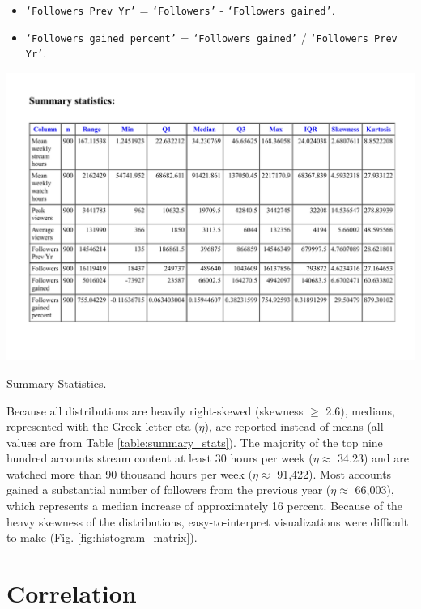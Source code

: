 \documentclass[12pt]{article}
\begin{document}
\begin{itemize}
	\item \texttt{`Followers Prev Yr’} = \texttt{`Followers’} - \texttt{`Followers gained’}.
	\item \texttt{`Followers gained percent’} = \texttt{`Followers gained’} / \texttt{`Followers Prev Yr’}.
\end{itemize}

\begin{table}[H]
  \centering
  \includegraphics[width=0.8\linewidth]{../StatCrunch_Results/table}
  \captionsetup{justification=centering, singlelinecheck=false, margin=2cm}
  \caption[Summary Statistics]{Summary Statistics.}
  \label{table:summary_stats}
\end{table}

Because all distributions are heavily right-skewed (skewness $\geq$ 2.6), medians, represented with the Greek letter eta ($\eta$), are reported instead of means (all values are from Table \ref{table:summary_stats}). The majority of the top nine hundred accounts stream content at least 30 hours per week ($\eta \approx$ 34.23) and are watched more than 90 thousand hours per week $(\eta \approx$ 91,422). Most accounts gained a substantial number of followers from the previous year ($\eta \approx$ 66,003), which represents a median increase of approximately 16 percent. Because of the heavy skewness of the distributions, easy-to-interpret visualizations were difficult to make (Fig. \ref{fig:histogram_matrix}).

\section{Correlation}\
\end{document}
